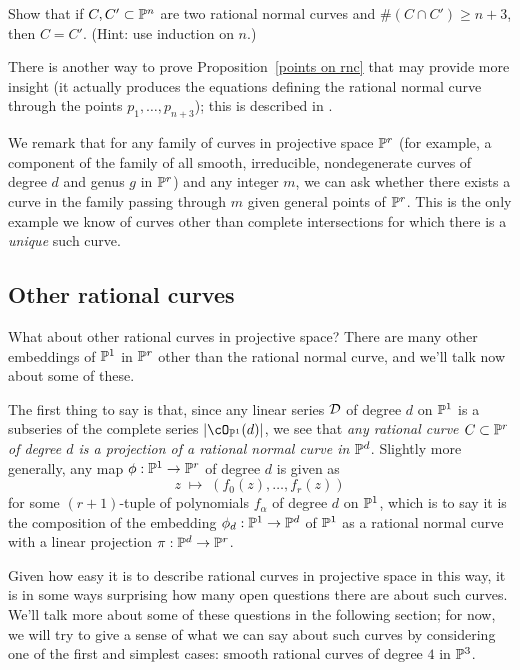 \begin{exercise}
Show that if $C, C' \subset \PP^n$ are two rational normal curves and $\#(C \cap C') \geq n+3$, then $C = C'$. (Hint: use induction on $n$.)
\end{exercise}

There is another way to prove Proposition~\ref{points on rnc} that may provide more insight (it actually produces the equations defining the rational normal curve through the points $p_1,\dots,p_{n+3}$); this is described in \cite{Montreal}. 

We remark that for any family of curves in projective space $\PP^r$ (for example, a component of the family of all smooth, irreducible, nondegenerate curves of degree $d$ and genus $g$ in $\PP^r$) and any integer $m$, we can ask whether there exists a curve in the family passing through $m$ given general points of $\PP^r$. This is the only example we know of curves other than complete intersections for which there is a \emph{unique} such curve.


\subsection{Other rational curves}

What about other rational curves in projective space? There are many other embeddings of $\PP^1$ in $\PP^r$ other than the rational normal curve, and we'll talk now about some of these.

The first thing to say is that, since any linear series $\cD$ of degree $d$ on $\PP^1$ is a subseries of the complete series $|\cO_{\PP^1}(d)|$, we see that \emph{any rational curve $C \subset \PP^r$ of degree $d$ is a projection of a rational normal curve in $\PP^d$}. Slightly more generally, any map $\phi : \PP^1 \to \PP^r$ of degree $d$ is given as
$$
z \; \mapsto \; (f_0(z), \dots, f_r(z))
$$
for some $(r+1)$-tuple of polynomials $f_\alpha$ of degree $d$ on $\PP^1$, which is to say it is the composition of the embedding $\phi_d : \PP^1 \to \PP^d$ of $\PP^1$ as a rational normal curve with a linear projection $\pi : \PP^d \to \PP^r$. 

Given how easy it is to describe rational curves in projective space in this way, it is in some ways surprising how many open questions there are about such curves. We'll talk more about some of these questions in the following section; for now, we will try to give a sense of what we can say about such curves by considering one of the first and simplest cases: smooth rational curves of degree $4$ in $\PP^3$.

